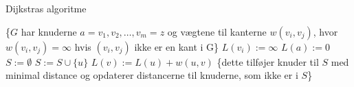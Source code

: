 \begin{algorithm}
\caption{Dijkstras algoritme}
\begin{algorithmic}[1]

    \State \{$G$ {har knuderne $a = v_{1}, v_{2}, \dotsc, v_{m} = z$ og vægtene til kanterne $w(v_{i}, v_{j})$, hvor $w(v_{i}, v_{j}) = \infty$ hvis {$(v_{i}, v_{j})$} ikke er en kant i G\}}
		\State $L(v_{i}) := \infty$
	\EndFor
	\State $L(a) := 0$	
	\State $S := \emptyset$
        \State $S := S \cup \{u\}$
        	 {$L(v) := L(u) + w(u,v)$}
        	\State \{dette tilføjer knuder til $S$ med minimal 			distance og opdaterer distancerne til
        	\State knuderne, som ikke er i $S$\}
        	\EndIf
    	\EndFor
    \EndWhile
\EndProcedure

\end{algorithmic}
\label{alg:dijkstra}
\end{algorithm}